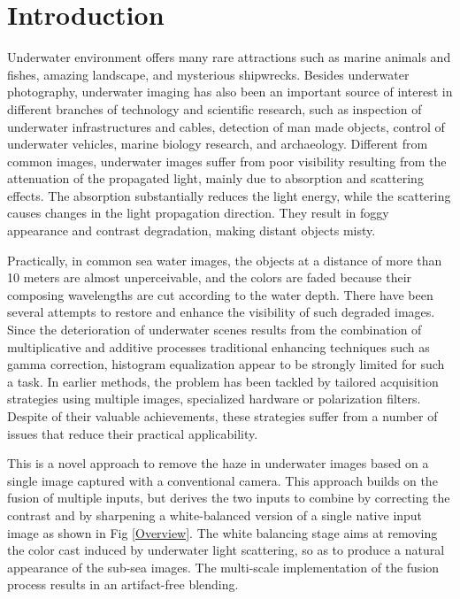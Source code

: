 \documentclass[hidelinks, 12pt]{report}
\begin{document}
\chapter{Introduction}
\fancyhf{}
\fancyhead[r]{%
   \itshape
\footnotesize{\chaptermark}
   \leftmark}
\fancyfoot[RE,RO]{\footnotesize\thepage}
\justify
Underwater environment offers many rare attractions such as marine animals and fishes, amazing landscape, and mysterious shipwrecks. Besides underwater photography, underwater imaging has also been an important source of interest in different branches of technology and scientific research, such as inspection of underwater infrastructures and cables, detection of man made objects, control of underwater vehicles, marine biology research, and archaeology. Different from common images, underwater images suffer from poor visibility resulting from the attenuation of the propagated light, mainly due to absorption and scattering effects. The absorption substantially reduces the light energy, while the scattering causes changes in the light propagation direction. They result in foggy appearance and contrast degradation, making distant objects misty. \par Practically, in common sea water images, the objects at a distance of more than 10 meters are almost unperceivable, and the colors are faded because their composing wavelengths are cut according to the water depth. There have been several attempts to restore and enhance the visibility of such degraded images. Since the deterioration of underwater scenes results from the combination of multiplicative and additive processes traditional enhancing techniques such as gamma correction, histogram equalization appear to be strongly limited for such a task. In earlier methods, the problem has been tackled by tailored acquisition strategies using multiple images, specialized hardware or polarization filters. Despite of their valuable achievements, these strategies suffer from a number of issues that reduce their practical applicability. \par This is a novel approach to remove the haze in underwater images based on a single image captured with a conventional camera. This approach builds on the fusion of multiple inputs, but derives the two inputs to combine by correcting the contrast and by sharpening a white-balanced version of a single native input image as shown in Fig \ref{Overview}. The white balancing stage aims at removing the color cast induced by underwater light scattering, so as to produce a natural appearance of the sub-sea images. The multi-scale implementation of the fusion process results in an artifact-free blending.
\end{document}
